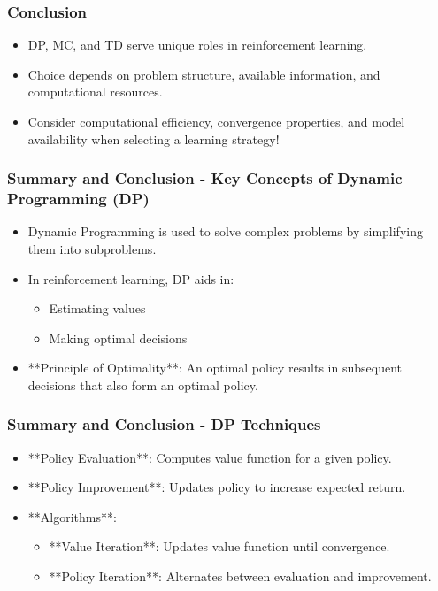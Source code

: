 \documentclass[aspectratio=169]{beamer}
\begin{document}
\begin{frame}[fragile]
    \frametitle{Conclusion}
    \begin{itemize}
        \item DP, MC, and TD serve unique roles in reinforcement learning.
        \item Choice depends on problem structure, available information, and computational resources.
        \item Consider computational efficiency, convergence properties, and model availability when selecting a learning strategy!
    \end{itemize}
\end{frame}

\begin{frame}[fragile]
  \frametitle{Summary and Conclusion - Key Concepts of Dynamic Programming (DP)}
  
  \begin{itemize}
      \item Dynamic Programming is used to solve complex problems by simplifying them into subproblems.
      \item In reinforcement learning, DP aids in:
      \begin{itemize}
          \item Estimating values
          \item Making optimal decisions
      \end{itemize}
      \item **Principle of Optimality**: An optimal policy results in subsequent decisions that also form an optimal policy.
  \end{itemize}
\end{frame}

\begin{frame}[fragile]
  \frametitle{Summary and Conclusion - DP Techniques}
  
  \begin{itemize}
      \item **Policy Evaluation**: Computes value function for a given policy.
      \item **Policy Improvement**: Updates policy to increase expected return.
      \item **Algorithms**:
      \begin{itemize}
          \item **Value Iteration**: Updates value function until convergence.
          \item **Policy Iteration**: Alternates between evaluation and improvement.
      \end{itemize}
  \end{itemize}
\end{frame}
\end{document}

